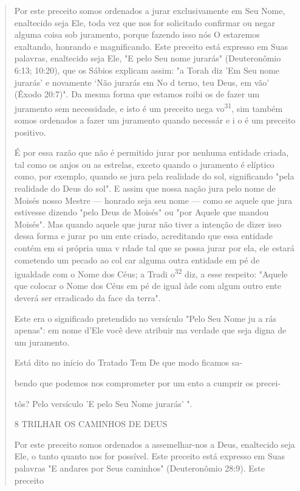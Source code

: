 \begin{quote}
Por este preceito somos ordenados a jurar exclusivamente em Seu Nome,
enaltecido seja Ele, toda vez que nos for solicitado confirmar ou negar
alguma coisa sob juramento, porque fazendo isso nós O estaremos
exaltando, honrando e magnificando. Este preceito está expresso em Suas
palavras, enal­tecido seja Ele, "E pelo Seu nome jurarás" (Deuteronômio
6:13; 10:20), que os Sábios explicam assim: "a Torah diz 'Em Seu nome
jurarás' e novamente `Não jurarás em No d terno, teu Deus, em vão'
(Êxodo 20:7)". Da mesma forma que estamos roibi os de fazer um juramento
sem necessidade, e isto é um preceito nega vo\textsuperscript{31}, sim
também somos ordenados a fazer um juramen­to quando necessár {e} i o é
um preceito positivo.

É por essa razão que não é permitido jurar por nenhuma entidade criada,
tal como os anjos ou as estrelas, exceto quando o juramento é elíptico
como, por exemplo, quando se jura pela realidade do sol, significando
"pela realidade do Deus do sol". E assim que nossa nação jura pelo nome
de Moisés nosso Mestre --- honrado seja seu nome --- como se aquele que
jura estivesse dizendo "pelo Deus de Moisés" ou "por Aquele que mandou
Moisés". Mas quan­do aquele que jurar não tiver a intenção de dizer isso
dessa forma e jurar po um ente criado, acreditando que essa entidade
contém em si própria uma v r­dade tal que se possa jurar por ela, ele
estará cometendo um pecado ao col car alguma outra entidade em pé de
igualdade com o Nome dos Céus; a Tradi o\textsuperscript{32} diz, a esse
respeito: "Aquele que colocar o Nome dos Céus em pé de igual àde com
algum outro ente deverá ser erradicado da face da terra".

Este era o significado pretendido no versículo "Pelo Seu Nome ju a­ rás
apenas": em nome d'Ele você deve atribuir ma verdade que seja digna de
um juramento.

Está dito no início do Tratado Tem De que modo ficamos sa-

bendo que podemos nos comprometer por um ento a cumprir os precei-

tôs? Pelo versículo 'E pelo Seu Nome jurarás' ".

8 TRILHAR OS CAMINHOS DE DEUS

Por este preceito somos ordenados a assemelhar-nos a Deus, enalte­cido
seja Ele, o tanto quanto nos for possível. Este preceito está expresso
em Suas palavras "E andares por Seus caminhos" (Deuteronômio 28:9). Este
preceito
\end{quote}

